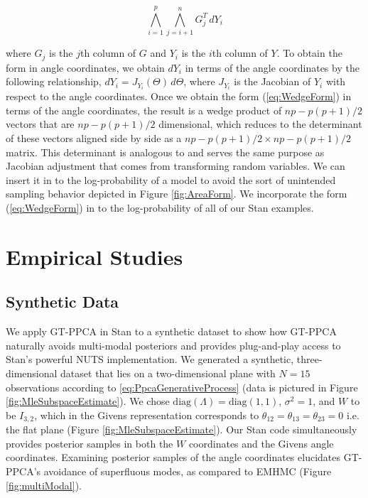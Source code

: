 \documentclass{article}
\begin{document}
\begin{equation}
\label{eq:WedgeForm}
\bigwedge_{i=1}^p \bigwedge_{j=i+1}^n G_j^T\, dY_i
\end{equation}

where $G_j$ is the $j$th column of $G$ and $Y_i$ is the $i$th column of $Y$. To obtain the form in angle coordinates, we obtain $dY_i$ in terms of the angle coordinates by the following relationship, $dY_i = J_{Y_i}(\Theta)\, d\Theta$, where $J_{Y_i}$ is the Jacobian of $Y_i$ with respect to the angle coordinates. Once we obtain the form (\ref{eq:WedgeForm}) in terms of the angle coordinates, the result is a wedge product of $np-p(p+1)/2$ vectors that are $np-p(p+1)/2$ dimensional, which reduces to the determinant of these vectors aligned side by side as a $np-p(p+1)/2 \times np-p(p+1)/2$ matrix. This determinant is analogous to and serves the same purpose as Jacobian adjustment that comes from transforming random variables. We can insert it in to the log-probability of a model to avoid the sort of unintended sampling behavior depicted in Figure \ref{fig:AreaForm}. We incorporate the form (\ref{eq:WedgeForm}) in to the log-probability of all of our Stan examples.

\section{Empirical Studies} \label{examples}

\subsection{Synthetic Data}
We apply GT-PPCA in Stan to a synthetic dataset to show how GT-PPCA naturally avoids multi-modal posteriors and provides plug-and-play access to Stan's powerful NUTS implementation. We generated a synthetic, three-dimensional dataset that lies on a two-dimensional plane with $N =15$ observations according to \ref{eq:PpcaGenerativeProcess} (data is pictured in Figure \ref{fig:MleSubspaceEstimate}). We chose $\mathrm{diag}(\Lambda) =\mathrm{diag}(1, 1)$, $\sigma^2 = 1$, and $W$ to be $I_{3,2}$, which in the Givens representation corresponds to $\theta_{12} = \theta_{13} = \theta_{23} = 0$ i.e. the flat plane (Figure \ref{fig:MleSubspaceEstimate}). Our Stan code simultaneously provides posterior samples in both the $W$ coordinates and the Givens angle coordinates. Examining posterior samples of the angle coordinates elucidates GT-PPCA's avoidance of superfluous modes, as compared to EMHMC (Figure \ref{fig:multiModal}).
\end{document}
